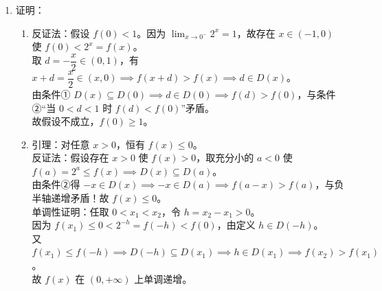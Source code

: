 {\begin{enumerate}[leftmargin=1.8em, label=(\arabic*), itemsep=0.5em, topsep=0.3em]
    \item 证明：
      \begin{enumerate}[leftmargin=1.5em, label=(\text{i})]
        \item 反证法：假设 \(f(0) < 1\)。因为 \(\lim_{x \to 0^-} 2^x = 1\)，故存在 \(x \in (-1, 0)\) 使 \(f(0) < 2^x = f(x)\)。\\
          取 \(d = -\dfrac{x}{2} \in (0, 1)\)，有 \(x+d = \dfrac{x}{2} \in (x, 0) \implies f(x+d) > f(x) \implies d \in D(x)\)。\\
          由条件① \(D(x) \subseteq D(0) \implies d \in D(0) \implies f(d) > f(0)\)，与条件②“当 \(0 < d < 1\) 时 \(f(d) < f(0)\)”矛盾。\\
          故假设不成立，\(f(0) \geqslant 1\)。

        \item 引理：对任意 \(x > 0\)，恒有 \(f(x) \leqslant 0\)。\\
          反证法：假设存在 \(x > 0\) 使 \(f(x) > 0\)，取充分小的 \(a < 0\) 使 \(f(a) = 2^a \leqslant f(x) \implies D(x) \subseteq D(a)\)。\\
          由条件②得 \(-x \in D(x) \implies -x \in D(a) \implies f(a-x) > f(a)\)，与负半轴递增矛盾！故 \(f(x) \leqslant 0\)。\\
          单调性证明：任取 \(0 < x_1 < x_2\)，令 \(h = x_2 - x_1 > 0\)。\\
          因为 \(f(x_1) \leqslant 0 < 2^{-h} = f(-h) < f(0)\)，由定义 \(h \in D(-h)\)。\\
          又 \(f(x_1) \leqslant f(-h) \implies D(-h) \subseteq D(x_1) \implies h \in D(x_1) \implies f(x_2) > f(x_1)\)。\\
          故 \(f(x)\) 在 \((0, +\infty)\) 上单调递增。
      \end{enumerate}
  \end{enumerate}%
}

\newcommand{\qFuncSubsetRelationDiagnosis}{%
  本题为导数与抽象函数压轴题，第(3)问极难。利用已知集合包含关系（条件①）来推导函数在正半轴的单调性，其突破口在于：先利用反证法锁定自变量在 0 处的边界值；再通过构造一个“恒为负数”的引理作为过渡，最后构造平移步长 \(h\) 结合包含关系完成单调性推导。%
}

\newcommand{\qFuncSubsetRelationTeachingNotes}{%
  本题是高阶抽象函数证明的代表作。教学讲评中应引导学生建立“翻译与构造”思维：首先学会将抽象的集合包含关系翻译为“函数值不等式关系”；其次，面对无从下手的单调性求证时，通过构造中介值（如引理 \(f(x)\leqslant 0\)）来进行过渡，这种反证和区间递推的设计是提升高考压轴题得分率的关键。%
}
